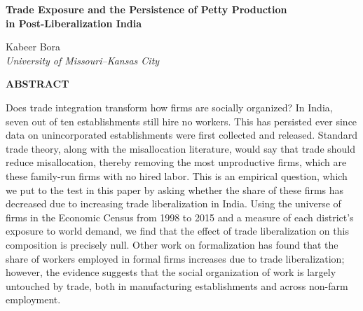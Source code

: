 \documentclass[11pt]{article}
\begin{document}
\begin{center}
{\Large\bfseries Trade Exposure and the Persistence of Petty Production\\[2pt]
in Post-Liberalization India\par}

\vspace{14pt}

Kabeer Bora\\[2pt]
\textit{University of Missouri--Kansas City}

\vspace{18pt}

\textbf{ABSTRACT}
\end{center}

\vspace{4pt}

Does trade integration transform how firms are socially organized? In India, seven out of ten establishments still hire no workers. This has persisted ever since data on unincorporated establishments were first collected and released. Standard trade theory, along with the misallocation literature, would say that trade should reduce misallocation, thereby removing the most unproductive firms, which are these family-run firms with no hired labor. This is an empirical question, which we put to the test in this paper by asking whether the share of these firms has decreased due to increasing trade liberalization in India. Using the universe of firms in the Economic Census from 1998 to 2015 and a measure of each district's exposure to world demand, we find that the effect of trade liberalization on this composition is precisely null. Other work on formalization has found that the share of workers employed in formal firms increases due to trade liberalization; however, the evidence suggests that the social organization of work is largely untouched by trade, both in manufacturing establishments and across non-farm employment.
\end{document}
